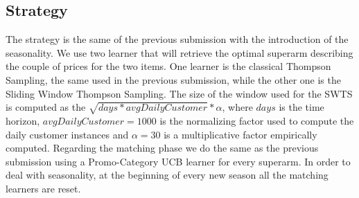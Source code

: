 \subsection*{Strategy}
The strategy is the same of the previous submission with the introduction of the seasonality. We use two learner that will retrieve the optimal superarm describing the couple of prices for the two items. One learner is the classical Thompson Sampling, the same used in the previous submission, while the other one is the Sliding Window Thompson Sampling. The size of the window used for the SWTS is computed as the $\sqrt{days * avgDailyCustomer} * \alpha$, where $days$ is the time horizon, $avgDailyCustomer = 1000$ is the normalizing factor used to compute the daily customer instances and $\alpha = 30 $ is a multiplicative factor empirically computed. Regarding the matching phase we do the same as the previous submission using a Promo-Category UCB learner for every superarm. In order to deal with seasonality, at the beginning of every new season all the matching learners are reset.

